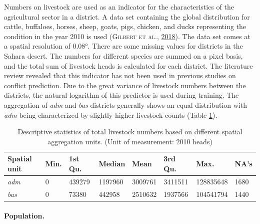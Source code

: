 \documentclass[a4paper,11pt]{article}
\begin{document}
Numbers on livestock are used as an indicator for the characteristics of the
agricultural sector in a district. A data set containing the global distribution
for cattle, buffaloes, horses, sheep, goats, pigs, chicken, and ducks representing
the condition in the year 2010 is used \textsc{(\textnormal{\textsc{Gilbert} \textsc{et al.}}, \textnormal{\protect\hyperlink{ref-gilbert2018}{2018}})}. The data set comes at a
spatial resolution of 0.08°. There are some missing values for districts in the
Sahara desert. The numbers for different species are summed on a pixel basis, and
the total sum of livestock heads is calculated for each district. The literature
review revealed that this indicator has not been used in previous studies on
conflict prediction. Due to the great variance of livestock numbers between the
districts, the natural logarithm of this predictor is used during training.
The aggregation of \emph{adm} and \emph{bas} districts generally shows an equal distribution
with \emph{adm} being characterized by slightly higher livestock counts
(Table \ref{tab:02-data-lvstk}).
\begin{table}[H]

\caption[Descriptive statistics of total livestock numbers.]{\label{tab:02-data-lvstk}Descriptive statistics of total livestock numbers based on different spatial
               aggregation units. (Unit of measurement: 2010 heads)}
\centering
\fontsize{10}{12}\selectfont
\begin{tabular}[t]{llllllll}
\toprule
Spatial unit & Min. & 1st Qu. & Median & Mean & 3rd Qu. & Max. & NA's\\
\midrule
\textit{adm} & 0 & 439279 & 1197960 & 3009761 & 3411511 & 128835648 & 1680\\
\textit{bas} & 0 & 73380 & 442958 & 2510632 & 1937566 & 104541794 & 1440\\
\bottomrule
\end{tabular}
\end{table}
\hypertarget{population.}{%
\paragraph{Population.}\label{population.}}
\end{document}
